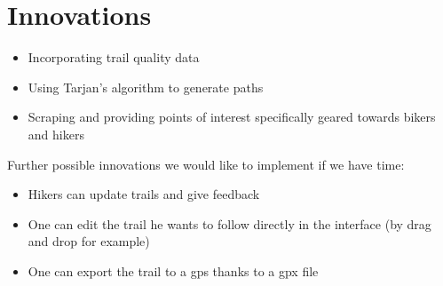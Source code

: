 \documentclass[sigconf]{acmart}
\begin{document}
\section{Innovations}
\begin{itemize}
	\item Incorporating trail quality data
	\item Using Tarjan's algorithm to generate paths
	\item Scraping and providing points of interest specifically geared towards bikers and hikers
\end{itemize}

Further possible innovations we would like to implement if we have time:
\begin{itemize}
	\item Hikers can update trails and give feedback
	\item One can edit the trail he wants to follow directly in the interface (by drag and drop for example)
	\item One can export the trail to a gps thanks to a gpx file
\end{itemize}
\end{document}
